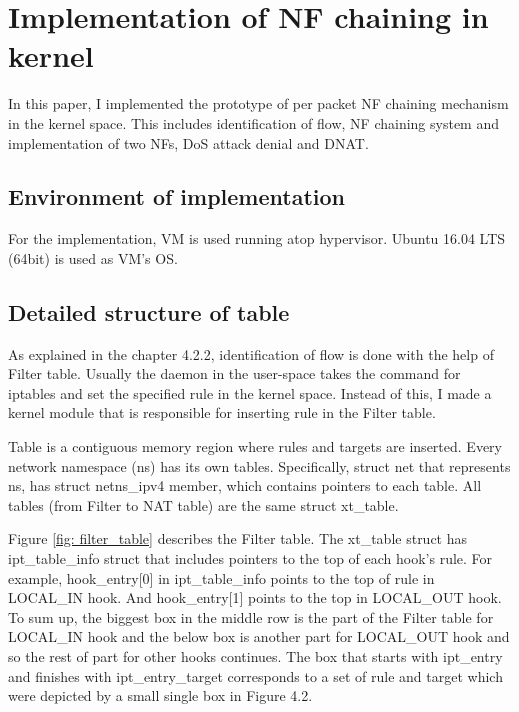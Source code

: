 \section{Implementation of NF chaining in kernel}
In this paper, I implemented the prototype of per packet NF chaining mechanism in the kernel space. This includes identification of flow, NF chaining system and implementation of two NFs, DoS attack denial and DNAT. 

\subsection{Environment of implementation}
For the implementation, VM is used running atop hypervisor. Ubuntu 16.04 LTS (64bit) is used as VM's OS. 

\subsection{Detailed structure of table}
As explained in the chapter 4.2.2, identification of flow is done with the help of Filter table. Usually the daemon in the user-space takes the command for iptables and set the specified rule in the kernel space. Instead of this, I made a kernel module that is responsible for inserting rule in the Filter table. 

Table is a contiguous memory region where rules and targets are inserted. Every network namespace (ns) has its own tables. Specifically, struct net that represents ns, has struct netns\_ipv4 member, which contains pointers to each table. All tables (from Filter to NAT table) are the same struct xt\_table. 	


Figure \ref{fig: filter_table} describes the Filter table. The xt\_table struct has ipt\_table\_info struct that includes pointers to the top of each hook's rule. For example, hook\_entry[0] in ipt\_table\_info points to the top of rule in LOCAL\_IN hook. And hook\_entry[1] points to the top in LOCAL\_OUT hook. To sum up, the biggest box in the middle row is the part of the Filter table for LOCAL\_IN hook and the below box is another part for LOCAL\_OUT hook and so the rest of part for other hooks continues. The box that starts with ipt\_entry and finishes with ipt\_entry\_target corresponds to a set of rule and target which were depicted by a small single box in Figure 4.2. 

